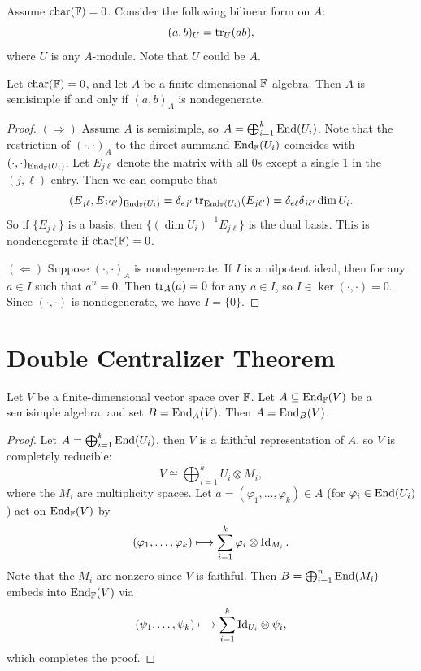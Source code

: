 \begin{remark}
  Assume $\operatorname{char}(\mathbb{F}) = 0$.
  Consider the following bilinear
  form on $A$:
  \[
    (a, b)_U = \operatorname{tr}_U(ab),
  \]
  where $U$ is any $A$-module. Note that
  $U$ could be $A$.
\end{remark}

\begin{theorem}
  Let $\operatorname{char}(\mathbb{F}) = 0$, and let
  $A$ be a finite-dimensional $\mathbb{F}$-algebra.
  Then $A$ is semisimple if and only if
  $(a, b)_A$ is nondegenerate.
\end{theorem}

\begin{proof}
  $(\Rightarrow)$ Assume $A$ is
  semisimple, so
  $A = \bigoplus_{i = 1}^k \operatorname{End}(U_i)$.
  Note that the restriction of
  $(\cdot, \cdot)_A$ to the
  direct summand $\operatorname{End}_{\mathbb{F}}(U_i)$
  coincides with
  $(\cdot, \cdot)_{\operatorname{End}_{\mathbb{F}}(U_i)}$.
  Let $E_{j \ell}$ denote the matrix with
  all $0$s except a single $1$ in the
  $(j, \ell)$ entry. Then we can compute
  that
  \[
    (E_{j \ell}, E_{j' \ell'})_{\operatorname{End}_{\mathbb{F}}(U_i)}
    = \delta_{ej'} \operatorname{tr}_{\operatorname{End}_{\mathbb{F}}(U_i)}(E_{j\ell'})
    = \delta_{e\ell} \delta_{j \ell'}
    \dim U_i.
  \]
  So if $\{E_{j \ell}\}$ is a basis, then
  $\{(\dim U_i)^{-1} E_{j \ell}\}$
  is the dual basis.
  This is nondenegerate if
  $\operatorname{char}(\mathbb{F}) = 0$.

  $(\Leftarrow)$ Suppose $(\cdot, \cdot)_A$
  is nondegenerate. If $I$ is a nilpotent
  ideal, then for any $a \in I$
  such that $a^n = 0$. Then $\operatorname{tr}_A(a) = 0$
  for any $a \in I$, so
  $I \in \ker(\cdot, \cdot) = 0$.
  Since $(\cdot, \cdot)$ is nondegenerate,
  we have $I = \{0\}$.
\end{proof}

\section{Double Centralizer Theorem}

\begin{theorem}
  Let $V$ be a finite-dimensional vector
  space over $\mathbb{F}$. Let
  $A \subseteq \operatorname{End}_{\mathbb{F}}(V)$ be a semisimple
  algebra, and
  set $B = \operatorname{End}_A(V)$. Then
  $A = \operatorname{End}_B(V)$.
\end{theorem}

\begin{proof}
  Let $A = \bigoplus_{i = 1}^k \operatorname{End}(U_i)$,
  then $V$ is a faithful representation
  of $A$, so $V$ is completely reducible:
  \[
    V \cong \bigoplus_{i = 1}^k U_i \otimes M_i,
  \]
  where the $M_i$ are multiplicity spaces.
  Let $a = (\varphi_1, \dots, \varphi_k) \in A$
  (for $\varphi_i \in \operatorname{End}(U_i)$)
  act on $\operatorname{End}_{\mathbb{F}}(V)$ by
  \[
    (\varphi_1, \dots, \varphi_k)
    \longmapsto
    \sum_{i = 1}^k \varphi_i \otimes \operatorname{Id}_{M_i}.
  \]
  Note that the $M_i$ are nonzero
  since $V$ is faithful. Then 
  $B = \bigoplus_{i = 1}^n \operatorname{End}(M_i)$
  embeds into $\operatorname{End}_{\mathbb{F}}(V)$ via
  \[
    (\psi_1, \dots, \psi_k)
    \longmapsto
    \sum_{i = 1}^k {\operatorname{Id}_{U_i}} \otimes \psi_i,
  \]
  which completes the proof.
\end{proof}

